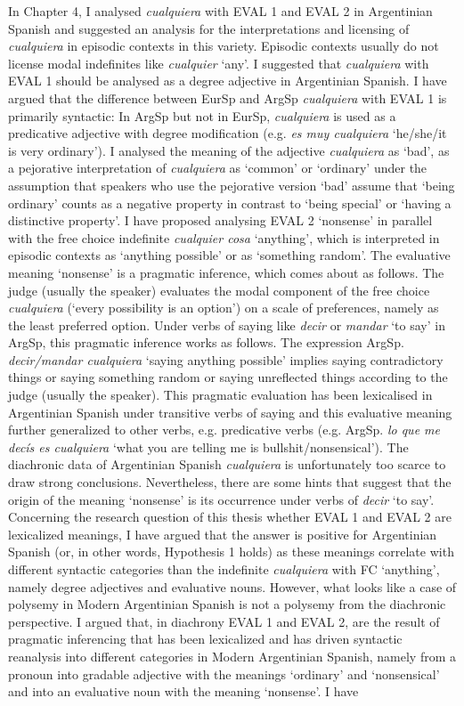   In Chapter 4, I analysed \textit{cualquiera} with EVAL 1 and EVAL 2 in Argentinian Spanish and suggested an analysis for the interpretations and licensing of \textit{cualquiera} in episodic contexts in this variety. Episodic contexts usually do not license modal indefinites like \textit{cualquier} ‘any’. I suggested that \textit{cualquiera} with EVAL 1 should be analysed as a degree adjective in Argentinian Spanish. I have argued that the difference between EurSp and ArgSp \textit{cualquiera} with EVAL 1 is primarily syntactic: In ArgSp but not in EurSp, \textit{cualquiera} is used as a predicative adjective with degree modification (e.g. \textit{es muy cualquiera} ‘he/she/it is very ordinary’). I analysed the meaning of the adjective \textit{cualquiera} as ‘bad’, as a pejorative interpretation of \textit{cualquiera} as ‘common’ or ‘ordinary’ under the assumption that speakers who use the pejorative version ‘bad’ assume that ‘being ordinary’ counts as a negative property in contrast to ‘being special’ or ‘having a distinctive property’. I have proposed analysing EVAL 2 ‘nonsense’ in parallel with the free choice indefinite \textit{cualquier cosa} ‘anything’, which is interpreted in episodic contexts as ‘anything possible’ or as ‘something random’. The evaluative meaning ‘nonsense’ is a pragmatic inference, which comes about as follows. The judge (usually the speaker) evaluates the modal component of the free choice \textit{cualquiera} (‘every possibility is an option’) on a scale of preferences, namely as the least preferred option. Under verbs of saying like \textit{decir} or \textit{mandar} ‘to say’ in ArgSp, this pragmatic inference works as follows. The expression ArgSp. \textit{decir/mandar cualquiera} ‘saying anything possible’ implies saying contradictory things or saying something random or saying unreflected things according to the judge (usually the speaker). This pragmatic evaluation has been lexicalised in Argentinian Spanish under transitive verbs of saying and this evaluative meaning further generalized to other verbs, e.g. predicative verbs (e.g. ArgSp. \textit{lo que me decís es cualquiera} ‘what you are telling me is bullshit/nonsensical’). The diachronic data of Argentinian Spanish \textit{cualquiera} is unfortunately too scarce to draw strong conclusions. Nevertheless, there are some hints that suggest that the origin of the meaning ‘nonsense’ is its occurrence under verbs of \textit{decir} ‘to say’. Concerning the research question of this thesis whether EVAL 1 and EVAL 2 are lexicalized meanings, I have argued that the answer is positive for Argentinian Spanish (or, in other words, Hypothesis 1 holds) as these meanings correlate with different syntactic categories than the indefinite \textit{cualquiera} with FC ‘anything’, namely degree adjectives and evaluative nouns. However, what looks like a case of polysemy in Modern Argentinian Spanish is not a polysemy from the diachronic perspective. I argued that, in diachrony EVAL 1 and EVAL 2, are the result of pragmatic inferencing that has been lexicalized and has driven syntactic reanalysis into different categories in Modern Argentinian Spanish, namely from a pronoun into gradable adjective with the meanings ‘ordinary’ and ‘nonsensical’ and into an evaluative noun with the meaning ‘nonsense’. I have 